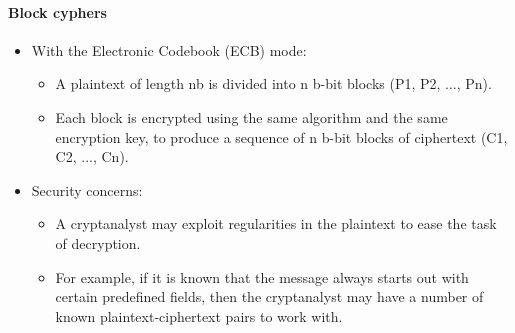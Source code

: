 \documentclass{article}
\begin{document}
                            \paragraph{Block cyphers}
                                    \begin{itemize}
                                        \item With the Electronic Codebook (ECB) mode:
                                        \begin{itemize}
                                            \item A plaintext of length nb is divided into n b-bit blocks (P1, P2, ..., Pn).
                                            \item Each block is encrypted using the same algorithm and the same encryption key, to produce a sequence of n b-bit blocks of ciphertext (C1, C2, ..., Cn).
                                        \end{itemize}
                                        \item Security concerns:
                                        \begin{itemize}
                                            \item A cryptanalyst may exploit regularities in the plaintext to ease the task of decryption.
                                            \item For example, if it is known that the message always starts out with certain predefined fields, then the cryptanalyst may have a number of known plaintext-ciphertext pairs to work with.
                                        \end{itemize}
                                    \end{itemize}
\end{document}
